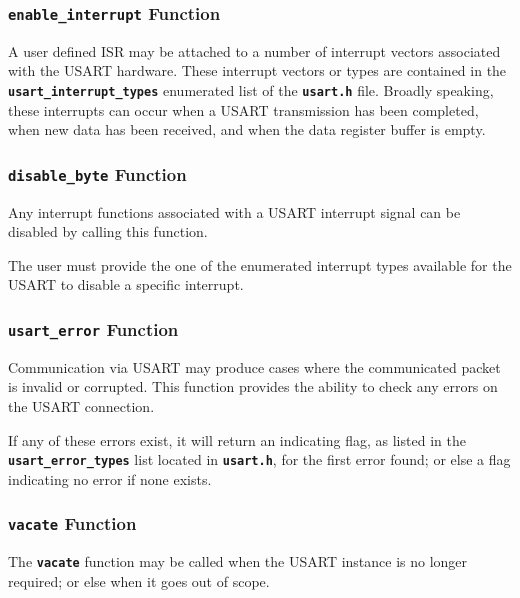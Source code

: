 \documentclass[a4paper, oneside, 11pt, titlepage, onecolumn, openright]{article}
\begin{document}
\subsubsection{\textbf{\texttt{enable\_interrupt}} Function}
			\label{sss:HALusartenable_interruptFunction}	
			
			A user defined ISR may be attached to a number of interrupt vectors associated with the USART hardware. These interrupt vectors or types are contained in the \textbf{\texttt{usart\_interrupt\_types}} enumerated list of the \textbf{\texttt{usart.h}} file.	Broadly speaking, these interrupts can occur when a USART transmission has been completed, when new data has been received, and when the data register buffer is empty.
			
\subsubsection{\textbf{\texttt{disable\_byte}} Function}
			\label{sss:HALusartdisable_byteFunction}
			
			Any interrupt functions associated with a USART interrupt signal can be disabled by calling this function.
			
			The user must provide the one of the enumerated interrupt types available for the USART to disable a specific interrupt. 
			
\subsubsection{\textbf{\texttt{usart\_error}} Function}
			\label{sss:HALusart_errorFunction}
			
			Communication via USART may produce cases where the communicated packet is invalid or corrupted. This function provides the ability to check any errors on the USART connection.
			
			If any of these errors exist, it will return an indicating flag, as listed in the \textbf{\texttt{usart\_error\_types}} list located in \textbf{\texttt{usart.h}}, for the first error found; or else a flag indicating no error if none exists.
			
\subsubsection{\textbf{\texttt{vacate}} Function}
			\label{sss:HALusartvacateFunction}
			
			The \textbf{\texttt{vacate}} function may be called when the USART instance is no longer required; or else when it goes out of scope.
			
\end{document}
